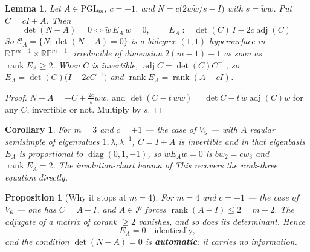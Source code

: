\documentclass[11pt,a4paper]{article}
\theoremstyle{plain}
\newtheorem{lemma}[theorem]{Lemma}
\newtheorem{proposition}[theorem]{Proposition}
\newtheorem{corollary}[theorem]{Corollary}
\theoremstyle{definition}
\theoremstyle{remark}
\newcommand{\RP}{\mathbb{RP}}
\newcommand{\PGL}{\mathrm{PGL}}
\newcommand{\rk}{\operatorname{rank}}
\begin{document}
\begin{lemma}\label{lem:EA}
Let $A\in\PGL_m$, $c=\pm1$, and $N=c\bigl(2w\tilde w/s-I\bigr)$ with $s=\tilde ww$.
Put $C=cI+A$. Then
\[
  \det(N-A)=0\iff \tilde w\,E_A\,w=0,\qquad
  \boxed{\,E_A:=\det(C)\,I-2c\operatorname{adj}(C)\,}
\]
So $\mathcal C_A=\{N:\det(N-A)=0\}$ is a bidegree $(1,1)$ hypersurface in
$\RP^{m-1}\times\RP^{m-1}$, irreducible of dimension $2(m-1)-1$ as soon as
$\rk E_A\ge2$. When $C$ is invertible, $\operatorname{adj}C=\det(C)C^{-1}$, so
$E_A=\det(C)\bigl(I-2cC^{-1}\bigr)$ and $\rk E_A=\rk(A-cI)$.
\end{lemma}

\begin{proof}
$N-A=-C+\tfrac{2c}{s}w\tilde w$, and $\det(C-t\,w\tilde w)=\det C-t\,\tilde
w\operatorname{adj}(C)w$ for any $C$, invertible or not. Multiply by $s$.
\end{proof}

\begin{corollary}
For $m=3$ and $c=+1$ --- the case of $V_5$ --- with $A$ regular semisimple of
eigenvalues $1,\lambda,\lambda^{-1}$, $C=I+A$ is invertible and in that eigenbasis
$E_A$ is proportional to $\operatorname{diag}(0,1,-1)$, so $\tilde wE_Aw=0$ is
$bw_2=cw_3$ and $\rk E_A=2$.  The involution-chart lemma of
This recovers the rank-three equation directly.
\end{corollary}

\begin{proposition}[Why it stops at $m=4$]\label{prop:stops}
For $m=4$ and $c=-1$ --- the case of $V_6$ --- one has $C=A-I$, and $A\in\mathcal P$
forces $\rk(A-I)\le2=m-2$. The adjugate of a matrix of corank $\ge2$ vanishes, and
so does its determinant. Hence
\[
  E_A=0\quad\text{identically,}
\]
and the condition $\det(N-A)=0$ is \textbf{automatic}: it carries no information.
\end{proposition}
\end{document}
